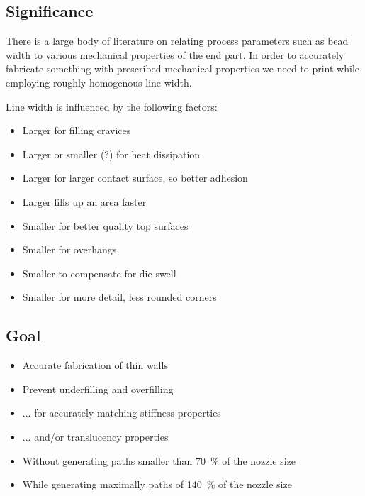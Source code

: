 \subsection{Significance}

There is a large body of literature on relating process parameters such as bead width to various mechanical properties of the end part.
In order to accurately fabricate something with prescribed mechanical properties we need to print while employing roughly homogenous line width.

Line width is influenced by the following factors:
\begin{itemize}
\item Larger for filling cravices
\item Larger or smaller (?) for heat dissipation
\item Larger for larger contact surface, so better adhesion \cite{N.Turner2014}
\item Larger fills up an area faster \cite{ahn2002anisotropic}
\item Smaller for better quality top surfaces \cite{ahn2002anisotropic}
\item Smaller for overhangs
\item Smaller to compensate for die swell
\item Smaller for more detail, less rounded corners \cite{N.Turner2014}
\end{itemize}

\subsection{Goal}
\begin{itemize}
\item Accurate fabrication of thin walls
\item Prevent underfilling and overfilling
\item ... for accurately matching stiffness properties
\item ... and/or translucency properties
\item Without generating paths smaller than \SI{70}{\percent} of the nozzle size
\item While generating maximally paths of \SI{140}{\percent} of the nozzle size
\end{itemize}



